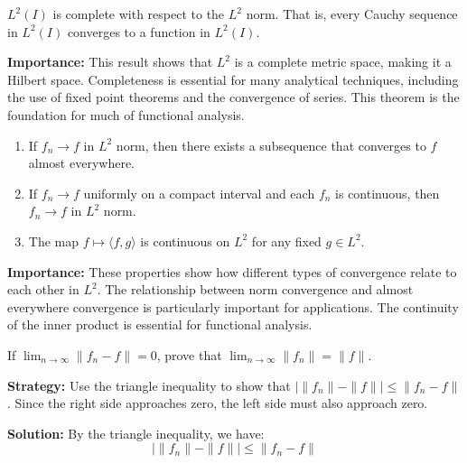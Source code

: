 \begin{theorem}
$L^2(I)$ is complete with respect to the $L^2$ norm. That is, every Cauchy sequence in $L^2(I)$ converges to a function in $L^2(I)$.
\end{theorem}

\noindent\textbf{Importance:} This result shows that $L^2$ is a complete metric space, making it a Hilbert space. Completeness is essential for many analytical techniques, including the use of fixed point theorems and the convergence of series. This theorem is the foundation for much of functional analysis.



\begin{theorem}
\begin{enumerate}[label=(\alph*)]
\item If $f_n \to f$ in $L^2$ norm, then there exists a subsequence that converges to $f$ almost everywhere.
\item If $f_n \to f$ uniformly on a compact interval and each $f_n$ is continuous, then $f_n \to f$ in $L^2$ norm.
\item The map $f \mapsto \langle f, g \rangle$ is continuous on $L^2$ for any fixed $g \in L^2$.
\end{enumerate}
\end{theorem}

\noindent\textbf{Importance:} These properties show how different types of convergence relate to each other in $L^2$. The relationship between norm convergence and almost everywhere convergence is particularly important for applications. The continuity of the inner product is essential for functional analysis.





\begin{problembox}
\begin{problemstatement}
If $\lim_{n \to \infty} \| f_n - f \| = 0$, prove that $\lim_{n \to \infty} \| f_n \| = \| f \|$.
\end{problemstatement}
\end{problembox}

\noindent\textbf{Strategy:} Use the triangle inequality to show that $|\| f_n \| - \| f \|| \leq \| f_n - f \|$. Since the right side approaches zero, the left side must also approach zero.

\bigskip\noindent\textbf{Solution:}
By the triangle inequality, we have:
\[|\| f_n \| - \| f \|| \leq \| f_n - f \|\]

